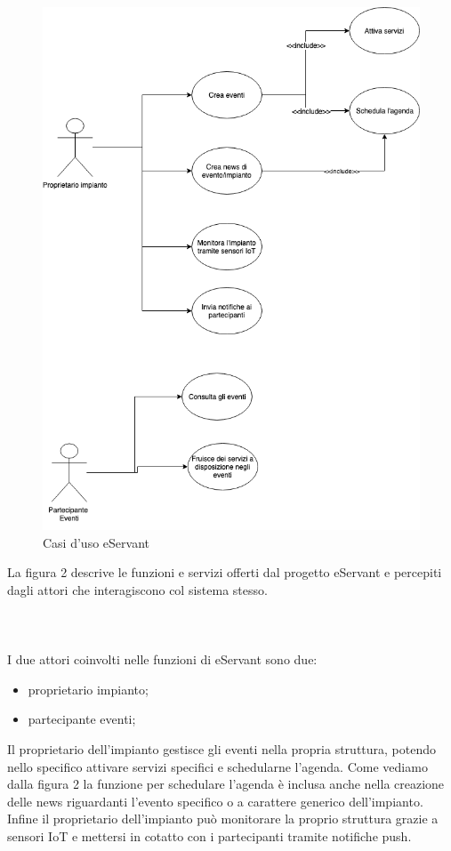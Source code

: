 \begin{figure}[h!]
    \centering  
    \caption{Casi d'uso eServant}
    \includegraphics[scale=0.5]{img/cap1/casidiuso}
\end{figure}
La figura 2 descrive le funzioni e servizi offerti dal progetto eServant e percepiti dagli attori che interagiscono col sistema stesso.
\\\\\\\\I due attori coinvolti nelle funzioni di eServant sono due:
\begin{itemize}
    \item proprietario impianto;
    \item partecipante eventi;
\end{itemize}

Il proprietario dell'impianto gestisce gli eventi nella propria struttura, potendo nello specifico attivare servizi specifici e schedularne l'agenda.
Come vediamo dalla figura 2 la funzione per schedulare l'agenda è inclusa anche nella creazione delle news riguardanti l'evento specifico o a
carattere generico dell'impianto.
Infine il proprietario dell'impianto può monitorare la proprio struttura grazie a sensori IoT e mettersi in cotatto con i partecipanti tramite notifiche push.

